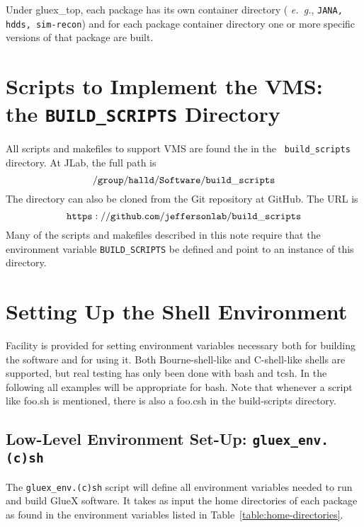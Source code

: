 \documentclass[12pt]{article}
\begin{document}
Under gluex\_top, each package has its own container directory ({\it
  e.~g.}, {\tt JANA, hdds, sim-recon}) and for each package container
directory one or more specific versions of that package are built.

\section{Scripts to Implement the VMS: \\ the {\tt BUILD\_SCRIPTS} Directory}

All scripts and makefiles to support VMS are found the in the {\tt
  build\_scripts} directory. At JLab, the full path is
$${\tt /group/halld/Software/build\_scripts}$$
The directory can also be cloned from the Git repository at GitHub. The URL is
$${\tt https://github.com/jeffersonlab/build\_scripts}$$
Many of the scripts and makefiles described in this note require that
the environment variable {\tt BUILD\_SCRIPTS} be defined and point to
an instance of this directory.

\section{Setting Up the Shell Environment}

Facility is provided for setting environment variables necessary both
for building the software and for using it. Both Bourne-shell-like and
C-shell-like shells are supported, but real testing has only been done
with bash and tcsh. In the following all examples will be appropriate
for bash. Note that whenever a script like foo.sh is mentioned, there
is also a foo.csh in the build-scripts directory.

\subsection{Low-Level Environment Set-Up: {\tt gluex\_env.(c)sh}}
\label{section:low-level-environment-setting}

The {\tt gluex\_env.(c)sh} script will define all environment
variables needed to run and build GlueX software. It takes as input
the home directories of each package as found in the environment
variables listed in Table~\ref{table:home-directories}.
\end{document}
